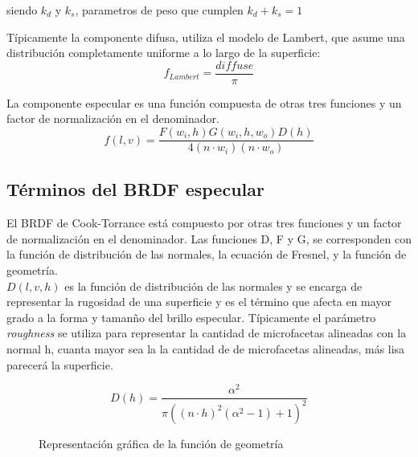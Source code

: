     siendo $k_d$ y $k_s$, parametros de peso que cumplen $k_d + k_s = 1$
    \singlespacing
    
    T\'ipicamente la componente difusa, utiliza el modelo de Lambert, que asume una distribuci\'on completamente uniforme a lo
    largo de la superficie:\\
    
    \begin{equation}
    f_{Lambert} = \frac{diffuse}{\pi}
    \end{equation}
    \singlespacing
    
    La componente especular es una funci\'on compuesta de otras tres funciones y un factor de normalizaci\'on en el
    denominador.\\
    
    \begin{equation}
        f(l, v) = \frac{F(w_i, h) G(w_i, h, w_o) D(h)} {4(n\cdot{w_i}) (n \cdot{w_o})}
    \end{equation}
    \singlespacing
    
        \subsection{T\'erminos del BRDF especular}
            El BRDF de Cook-Torrance est\'a compuesto por otras tres funciones y un factor de normalizaci\'on en el denominador.
            Las funciones D, F y G, se corresponden con la funci\'on de distribuci\'on de las normales, la ecuaci\'on de Fresnel,
            y la funci\'on de geometr\'ia.\\
    
            $D(l, v, h)$  es la funci\'on de distribuci\'on de las normales y se encarga de representar la rugosidad de una superficie
            y es el t\'ermino que afecta en mayor grado a la forma y taman\~no del brillo especular. T\'ipicamente el par\'ametro
            \textit{roughness} se utiliza para representar la cantidad de microfacetas alineadas con la normal h, cuanta mayor sea la
            la cantidad de de microfacetas alineadas, m\'as lisa parecer\'a la superficie.
    
            $$
            D(h) = \frac{\alpha^2}{\pi((n\cdot{h})^2(\alpha^2 - 1) + 1)^2}
            $$
    
            \begin{figure}[H]
                \vspace{0.5cm}
                \centering
                \caption{Representaci\'on gr\'afica de la funci\'on de geometr\'ia}
            \end{figure}
    
